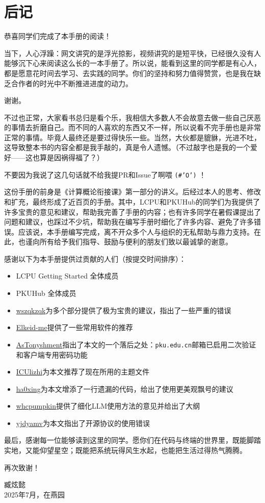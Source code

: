 \documentclass[../main.tex]{subfiles}
\begin{document}
\chapter{后记}

恭喜同学们完成了本手册的阅读！

当下，人心浮躁：网文讲究的是浮光掠影，视频讲究的是短平快，已经很久没有人能够沉下心来阅读这么长的一本手册了。所以说，能看到这里的同学都是有心人，都是愿意花时间去学习、去实践的同学。你们的坚持和努力值得赞赏，也是我在缺乏合作者的时光中不断推进进度的动力。

谢谢。

不过也正常，大家看书总归是看个乐，我相信大多数人不会故意去做一些自己厌恶的事情去折磨自己。而不同的人喜欢的东西又不一样，所以说看不完手册也是非常正常的事情。毕竟人最终还是要过得快乐一些。当然，大伙都是貔貅，光进不吐，这导致整本书的内容全都是我手敲的，真是令人遗憾。（不过敲字也是我的一个爱好——这也算是因祸得福了？）

不要因为我说了这几句话就不给我提PR和Issue了啊喂 \texttt{(\#'O')} ！

这份手册的前身是《计算概论衔接课》第一部分的讲义。后经过本人的思考、修改和扩充，最终形成了近百页的手册。其中，LCPU和PKUHub的同学们为我提供了许多宝贵的意见和建议，帮助我完善了手册的内容；也有许多同学在暑假课提出了问题和建议，也踩过不少坑，帮助我在编写手册时细化了许多内容、避免了许多错误。应该说，本手册编写完成，离不开众多个人与组织的无私帮助与鼎力支持。在此，也谨向所有给予我们指导、鼓励与便利的朋友们致以最诚挚的谢意。

感谢以下为本手册提供过贡献的人们（按提交时间排序）：

\begin{itemize}
  \item LCPU Getting Started 全体成员
  \item PKUHub 全体成员
  \item \faGithub\href{https://github.com/wszqkzqk}{wszqkzqk}为多个部分提供了极为宝贵的建议，指出了一些严重的错误
  \item \faGithub\href{https://github.com/Elkeid-me}{Elkeid-me}提供了一些常用软件的推荐
  \item \faGithub\href{https://github.com/AsTonyshment}{AsTonyshment}指出了本文的一个落后之处：\texttt{pku.edu.cn}邮箱已启用二次验证和客户端专用密码功能
  \item \faGithub\href{https://github.com/ICUlizhi}{ICUlizhi}为本文推荐了现在所用的主题文件
  \item \faGithub\href{https://github.com/ha0xing}{ha0xing}为本文增添了一行遗漏的代码，给出了使用更美观飘号的建议
  \item \faGithub\href{https://github.com/whcpumpkin}{whcpumpkin}提供了细化LLM使用方法的意见并给出了大纲
  \item \faGithub\href{https://github.com/yjdyamv}{yjdyamv}为本文指出了开源协议的使用错误
\end{itemize}

最后，感谢每一位能够读到这里的同学。愿你们在代码与终端的世界里，既能脚踏实地，又能仰望星空；既能把系统玩得风生水起，也能把生活过得热气腾腾。

再次致谢！

\vspace{2em}
\begin{flushright}
  臧炫懿 \\
  2025年7月，在燕园
\end{flushright}
\end{document}
